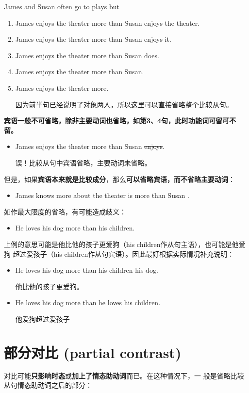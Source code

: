 James and Susan often go to plays but
\begin{enumerate}
\item James enjoys the theater more than Susan enjoys the theater.
\item James enjoys the theater more than Susan enjoys it.
\item James enjoys the theater more than Susan does.
\item James enjoys the theater more than Susan.
\item James enjoys the theater more.

  因为前半句已经说明了对象两人，所以这里可以直接省略整个比较从句。
\end{enumerate}
\textbf{宾语一般不可省略，除非主要动词也省略，如第3、4句，此时功能词可留可不留。}
\begin{itemize}
\item James enjoys the theater more than Susan \sout{enjoys}.

  误！比较从句中宾语省略，主要动词未省略。
\end{itemize}
但是，如果\textbf{宾语本来就是比较成分}，那么\textbf{可以省略宾语，而不省略主要动词}：
\begin{itemize}
\item James knows more about the theater is more than Susan .
\end{itemize}


如作最大限度的省略，有可能造成歧义：
\begin{itemize}
\item He loves his dog more than his children.
\end{itemize}
上例的意思可能是他比他的孩子更爱狗（his children作从句主语），也可能是他爱狗
超过爱孩子（his children作从句宾语）。因此最好根据实际情况补充说明：
\begin{itemize}
\item He loves his dog more than his children  his dog.

  他比他的孩子更爱狗。
\item He loves his dog more than he loves his children.

  他爱狗超过爱孩子
\end{itemize}


\section{部分对比 (partial contrast)}

对比可能\textbf{只影响时态}或\textbf{加上了情态助动词}而已。在这种情况下，一
般是省略比较从句情态助动词之后的部分：

